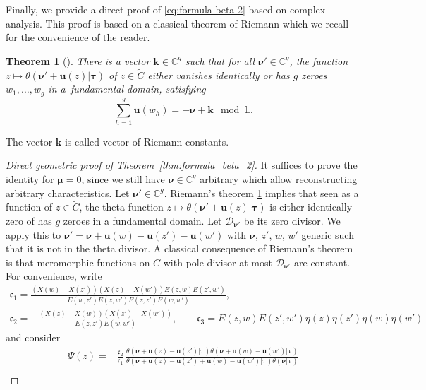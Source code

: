 \documentclass[pdftex]{sigma}
\numberwithin{equation}{section}
\newtheorem{Theorem}{Theorem}[section]
\newcommand{\C}{\mathbb{C}}
\begin{document}
Finally, we provide a direct proof of \eqref{eq:formula-beta-2} based on complex analysis.
This proof is based on a classical theorem of Riemann which we recall for the
convenience of the reader.

\begin{Theorem}[{\cite[Theorem 3.1]{Tata1}}]\label{thm:Riemann-zero}
 There is a vector $\bm{k} \in \C^{g}$ such that for all
 $\boldsymbol{\nu}' \in \C^{g}$, the function $z \mapsto \theta (\bm{\nu}' + \bm{u}(z) | \bm{\tau} )$ of $z \in \widetilde{C}$ either vanishes identically or has $g$ zeroes $w_1,\ldots,w_g$ in a~fundamental domain, satisfying
\[
\sum_{h=1}^{g}\bm{u}(w_{h}) = - \bm{\nu} + \bm{k} \mod \mathbb{L}.
\]
\end{Theorem}
The vector $\bm{k}$ is called vector of Riemann constants.

\begin{proof}[Direct geometric proof of Theorem~\ref{thm:formula_beta_2}]
It suffices to prove the identity for $\bm{\mu} = 0$, since we still have $\bm{\nu} \in \mathbb{C}^g$ arbitrary which allow reconstructing arbitrary characteristics. Let $\bm{\nu}' \in \C^{g}$. Riemann's
 theorem \ref{thm:Riemann-zero} implies that seen as a function of $z \in \widetilde{C}$, the theta
 function $z \mapsto \theta (\bm{\nu}' + \bm{u}(z) |\bm{\tau} )$ is either identically zero of has $g$ zeroes in a fundamental domain. Let $\mathcal{D}_{\bm{\nu}'}$ be its zero divisor. We apply this to $\bm{\nu}' = \bm{\nu} + \bm{u}(w) - \bm{u}(z') - \bm{u}(w')$ with $\bm{\nu}$, $z'$, $w$, $w'$ generic such that it is not in the theta divisor. A classical consequence of Riemann's theorem
 \cite[Theorem~VI.3.3]{Farkas-Kra} is that meromorphic functions on $C$ with pole divisor at most $\mathcal{D}_{\bm{\nu}'}$ are constant. For convenience, write
 \begin{gather*}
	 \mathfrak{c}_{1} = \frac{(X(w) - X(z'))(X(z) - X(w'))E(z,w)E(z',w')}{E(w,z')E(z,w')E(z,z')E(w,w')},\\
	 \mathfrak{c}_{2} = -\frac{(X(z) - X(w))(X(z') - X(w'))}{E(z,z')E(w,w')},\qquad
	 \mathfrak{c}_{3} = E(z,w)E(z',w')\eta(z)\eta(z')\eta(w)\eta(w')
 \end{gather*}
and consider
\begin{align*}
 \Psi(z) ={}& \frac{\mathfrak{c}_{2}}{\mathfrak{c}_1}\,\frac{\theta(\bm{\nu} + \bm{u}(z) - \bm{u}(z') |\bm{\tau} )\theta (\bm{\nu} + \bm{u}(w) - \bm{u}(w') |\bm{\tau} )}{\theta (\bm{\nu} + \bm{u}(z) - \bm{u}(z') + \bm{u}(w) - \bm{u}(w') |\bm{\tau} )\theta (\bm{\nu} |\bm{\tau} )} \\

\end{align*}
\end{proof}
\end{document}
